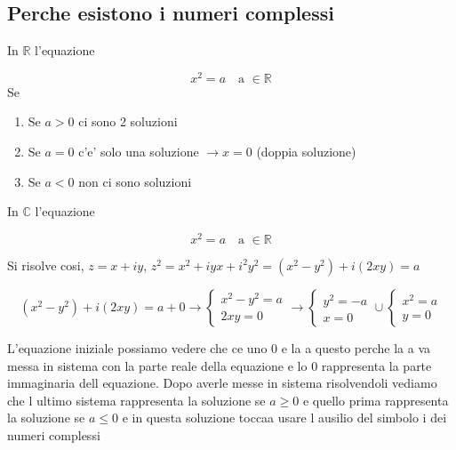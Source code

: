 \documentclass{article}
\begin{document}
          \subsection*{Perche esistono i numeri complessi}
          \begin{flushleft}
            In $\mathbb{R}$ l'equazione
          \end{flushleft}
          \begin{equation*}
            x^2=a \quad \text{a $\in \mathbb{R}$}
          \end{equation*}
          Se
          \begin{enumerate}
            \item Se $a>0$ ci sono 2 soluzioni
            \item Se $a=0$ c'e' solo una soluzione $\to x=0$ (doppia soluzione)
            \item Se $a<0$ non ci sono soluzioni
          \end{enumerate}
          \begin{flushleft}
            In $\mathbb{C}$ l'equazione
          \end{flushleft}
          \begin{equation*}
            x^2=a \quad \text{a $\in \mathbb{R}$}
          \end{equation*}
          \begin{flushleft}
            Si risolve cosi, $z=x+iy$, $z^2=x^2+iyx+i^2y^2=(x^2-y^2)+i(2xy)=a$
          \end{flushleft}
          \begin{equation*}
            (x^2-y^2)+i(2xy)=a+0 \to 
            \begin{cases}
              x^2-y^2=a  \\
              2xy=0
            \end{cases} \to 
            \begin{cases}
              y^2=-a \\
              x=0
            \end{cases} \cup 
            \begin{cases}
              x^2=a \\
              y=0
            \end{cases}
          \end{equation*}
          \begin{flushleft}
            L'equazione iniziale possiamo vedere che ce uno 0 e la a questo perche la a va messa in sistema con la parte reale della equazione e lo 0
            rappresenta la parte immaginaria dell equazione. Dopo averle messe in sistema risolvendoli vediamo che l ultimo sistema rappresenta
            la soluzione se $a\geq 0$ e quello prima rappresenta la soluzione se $a\leq 0$ e in questa soluzione toccaa usare l ausilio del simbolo i dei numeri complessi
          \end{flushleft}
      
\end{document}
